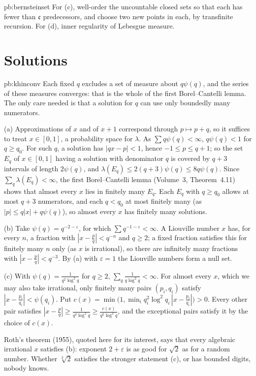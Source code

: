 \begin{hint}{pb:bernsteinset}
For (c), well-order the uncountable closed sets so that each has fewer than $\mathfrak c$ predecessors, and choose two new points in each, by transfinite
recursion. For (d), inner regularity of Lebesgue measure.
\end{hint}

\section*{Solutions}

\begin{solution}{pb:khinconv}
\idea Each fixed $q$ excludes a set of measure about $q\psi(q)$, and the series of these measures converges: that is the whole of the first
Borel--Cantelli lemma. The only care needed is that a solution for $q$ can use only boundedly many numerators.

\writeup (a) Approximations of $x$ and of $x+1$ correspond through $p\mapsto p+q$, so it suffices to treat $x\in[0,1]$, a probability space for
$\lambda$. As $\sum q\psi(q)<\infty$, $q\psi(q)<1$ for $q\ge q_0$. For such $q$, a solution has $|qx-p|<1$, hence $-1\le p\le q+1$; so the set $E_q$ of
$x\in[0,1]$ having a solution with denominator $q$ is covered by $q+3$ intervals of length $2\psi(q)$, and $\lambda(E_q)\le2(q+3)\psi(q)\le8q\psi(q)$.
Since $\sum_q\lambda(E_q)<\infty$, the first Borel--Cantelli lemma (Volume~3, Theorem~4.11) shows that almost every $x$ lies in finitely many $E_q$. Each $E_q$
with $q\ge q_0$ allows at most $q+3$ numerators, and each $q<q_0$ at most finitely many (as $|p|\le q|x|+q\psi(q)$), so almost every $x$ has finitely many
solutions.

(b) Take $\psi(q)=q^{-2-\varepsilon}$, for which $\sum q^{-1-\varepsilon}<\infty$. A Liouville number $x$ has, for every $n$, a fraction with
$|x-\frac pq|<q^{-n}$ and $q\ge2$; a fixed fraction satisfies this for finitely many $n$ only (as $x$ is irrational), so there are infinitely many fractions
with $|x-\frac pq|<q^{-3}$. By (a) with $\varepsilon=1$ the Liouville numbers form a null set.

(c) With $\psi(q)=\frac1{q^2\log^2q}$ for $q\ge2$, $\sum_q\frac1{q\log^2q}<\infty$. For almost every $x$, which we may also take irrational, only finitely many pairs
$(p_i,q_i)$ satisfy $|x-\frac{p_i}{q_i}|<\psi(q_i)$. Put $c(x)=\min\bigl(1,\min_iq_i^2\log^2q_i\,|x-\frac{p_i}{q_i}|\bigr)>0$. Every other pair satisfies
$|x-\frac pq|\ge\frac1{q^2\log^2q}\ge\frac{c(x)}{q^2\log^2q}$, and the exceptional pairs satisfy it by the choice of $c(x)$.

\leads Roth's theorem (1955), quoted here for its interest, says that every algebraic irrational $x$ satisfies (b): exponent $2+\varepsilon$ is as good
for $\sqrt2$ as for a random number. Whether $\sqrt[3]2$ satisfies the stronger statement (c), or has bounded digits, nobody knows.
\end{solution}


